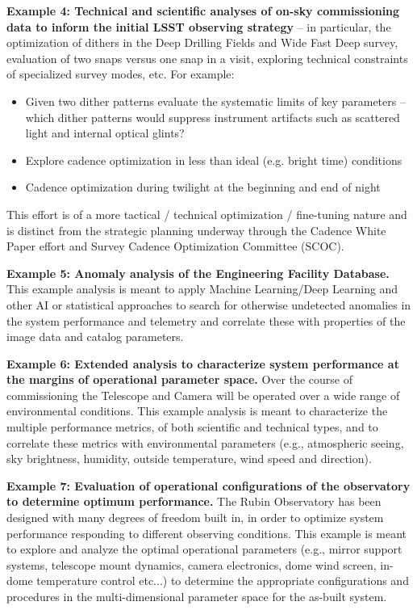 \documentclass[SE,authoryear,toc]{lsstdoc}
\begin{document}
\textbf{Example 4: Technical and scientific analyses of on-sky commissioning data to inform the initial LSST observing strategy} -- in particular, the optimization of dithers in the Deep Drilling Fields and Wide Fast Deep survey, evaluation of two snaps versus one snap in a visit, exploring technical constraints of specialized survey modes, etc.  For example:
\begin{itemize}
\item Given two dither patterns evaluate the systematic limits of key parameters -- which dither patterns would suppress instrument artifacts such as scattered light and internal optical glints?
\item Explore cadence optimization in less than ideal (e.g. bright time) conditions
\item Cadence optimization during twilight at the beginning and end of night
\end{itemize}
This effort is of a more tactical / technical optimization / fine-tuning nature and is distinct from the strategic planning underway through the Cadence White Paper effort and Survey Cadence Optimization Committee (SCOC).

\textbf{Example 5: Anomaly analysis of the Engineering Facility Database.} This example analysis is meant to apply Machine Learning/Deep Learning and other AI or statistical approaches to search for otherwise undetected anomalies in the system performance and telemetry and correlate these with properties of the image data and catalog parameters.
 
\textbf{Example 6: Extended analysis to characterize system performance at the margins of operational parameter space.} Over the course of commissioning the Telescope and Camera will be operated over a wide range of environmental conditions. This example analysis is meant to characterize the multiple performance metrics, of both scientific and technical types, and to correlate these metrics with environmental parameters (e.g., atmospheric seeing, sky brightness, humidity, outside temperature, wind speed and direction).
 
\textbf{Example 7: Evaluation of operational configurations of the observatory to determine optimum performance.} The Rubin Observatory has been designed with many degrees of freedom built in, in order to optimize system performance responding to different observing conditions. This example is meant to explore and analyze the optimal operational parameters (e.g., mirror support systems, telescope mount dynamics, camera electronics, dome wind screen, in-dome temperature control etc...) to determine the appropriate configurations and procedures in the multi-dimensional parameter space for the as-built system.
\end{document}

